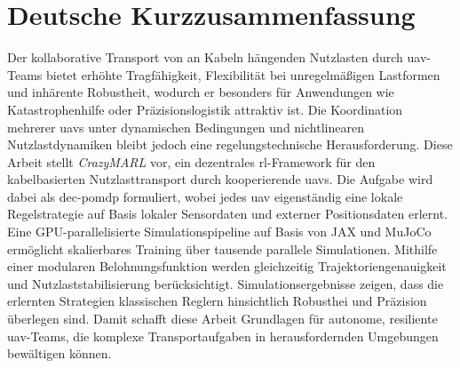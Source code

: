 \chapter*{Deutsche Kurzzusammenfassung}
Der kollaborative Transport von an Kabeln hängenden Nutzlasten durch \gls{uav}-Teams bietet erhöhte Tragfähigkeit, Flexibilität bei unregelmäßigen Lastformen und inhärente Robustheit, wodurch er besonders für Anwendungen wie Katastrophenhilfe oder Präzisionslogistik attraktiv ist. Die Koordination mehrerer \glspl{uav} unter dynamischen Bedingungen und nichtlinearen Nutzlastdynamiken bleibt jedoch eine regelungstechnische Herausforderung. Diese Arbeit stellt \textit{CrazyMARL} vor, ein dezentrales \gls{rl}-Framework für den kabelbasierten Nutzlasttransport durch kooperierende \glspl{uav}. Die Aufgabe wird dabei als \gls{dec-pomdp} formuliert, wobei jedes \gls{uav} eigenständig eine lokale Regelstrategie auf Basis lokaler Sensordaten und externer Positionsdaten erlernt. Eine GPU-parallelisierte Simulationspipeline auf Basis von JAX und MuJoCo ermöglicht skalierbares Training über tausende parallele Simulationen. Mithilfe einer modularen Belohnungsfunktion werden gleichzeitig Trajektoriengenauigkeit und Nutzlaststabilisierung berücksichtigt. Simulationsergebnisse zeigen, dass die erlernten Strategien klassischen Reglern hinsichtlich Robusthei und Präzision überlegen sind. Damit schafft diese Arbeit Grundlagen für autonome, resiliente \gls{uav}-Teams, die komplexe Transportaufgaben in herausfordernden Umgebungen bewältigen können.

\pagebreak